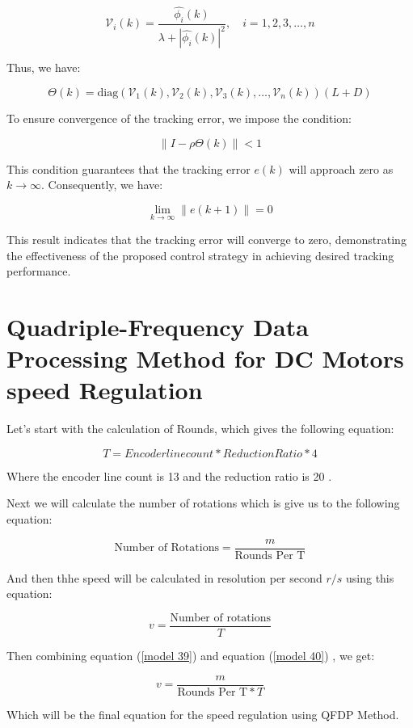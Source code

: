 \documentclass[journal,onecolumn]{IEEEtran}
\begin{document}
\[
\mathcal{V}_i(k) = \frac{\hat{\phi_i}(k)}{\lambda + |\hat{\phi_i}(k)|^2}, \quad i = 1, 2, 3, \dots, n
\]

Thus, we have:

\[
\Theta(k) = \text{diag}(\mathcal{V}_1(k), \mathcal{V}_2(k), \mathcal{V}_3(k), \dots, \mathcal{V}_n(k)) (L + D)
\]

To ensure convergence of the tracking error, we impose the condition:

\begin{equation}
    \label{model 37}
    \|I - \rho \Theta(k)\| < 1
\end{equation}

This condition guarantees that the tracking error \(e(k)\) will approach zero as \(k \to \infty\). Consequently, we have:

\[
\lim_{k \to \infty} \|e(k+1)\| = 0
\]

This result indicates that the tracking error will converge to zero, demonstrating the effectiveness of the proposed control strategy in achieving desired tracking performance.





\section{Quadriple-Frequency Data Processing Method for DC Motors speed Regulation}


Let's start with the calculation of Rounds, which gives the following equation:

\begin{equation}
    \label{model 38}
    T = Encoder line count * Reduction Ratio * 4
\end{equation}

Where the encoder line count is 13 and the reduction ratio is 20 .

Next we will calculate the number of rotations which is give us to the following equation:

\begin{equation}
    \label{model 39}
    \text{Number of Rotations} = \frac{m}{\text{Rounds Per T}}
\end{equation}

And then thhe speed will be calculated in resolution per second \(r/s\) using this equation:

\begin{equation}
    \label{model 40}
    v = \frac{\text{Number of rotations}}{T}
\end{equation}

Then combining equation (\ref{model 39}) and equation  (\ref{model 40}) , we get:

\begin{equation}
    \label{model 41}
    v = \frac{m}{\text{Rounds Per T}* T}
\end{equation}

Which will be the final equation for the speed regulation using QFDP Method.
\end{document}
